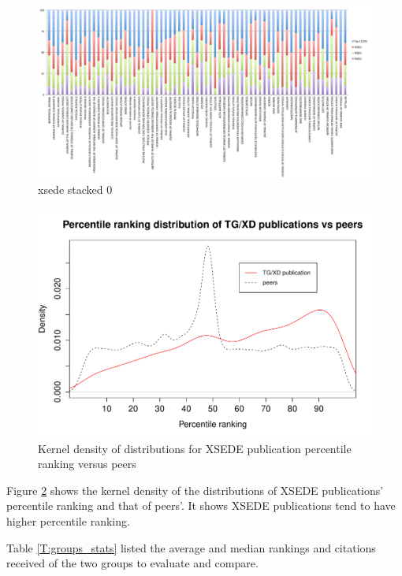 \documentclass{sig-alternate}
\begin{document}
\begin{figure}[htb] 
  \centering 
    \includegraphics[width=1.0\textwidth]{images-new/xsede-journal-stacked.pdf} 
  \caption{xsede stacked 0}\label{F:xsede-stacked} 
\end{figure}

\begin{figure}[htb]
  \centering 
    \includegraphics[width=1.0\columnwidth]{images-new/xd_peers_density.pdf} 
  \caption{Kernel density of distributions for XSEDE publication percentile ranking versus peers}\label{F:xd_peers_density} 
\end{figure}

Figure \ref{F:xd_peers_density} shows the kernel density of the
distributions of XSEDE publications' percentile ranking and that of
peers'. It shows XSEDE publications tend to have higher percentile
ranking.

Table \ref{T:groups_stats} listed the average and median rankings and
citations received of the two groups to evaluate and compare.
\end{document}
